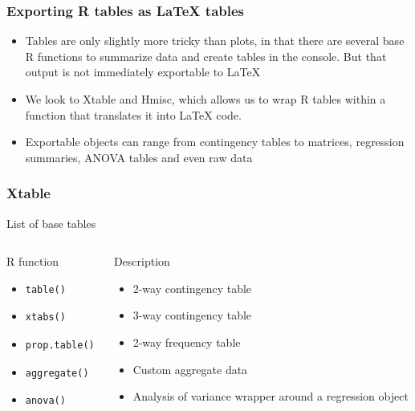 \documentclass[nogin]{beamer}\usepackage[]{graphicx}\usepackage[]{color}
\begin{document}
\begin{frame}[fragile]
\frametitle{Exporting R tables as LaTeX tables }
\begin{itemize}
\item Tables are only slightly more tricky than plots, in that there are several base R functions to summarize data and create tables in the console. But that output is not immediately exportable to LaTeX
\item We look to Xtable and Hmisc, which allows us to wrap R tables within a function that translates it into LaTeX code.
\item Exportable objects can range from contingency tables to matrices, regression summaries, ANOVA tables and even raw data
\end{itemize}
\end{frame}

\begin{frame}[fragile]
\frametitle{Xtable}
{\small List of base tables}
\begin{columns}[T]
\begin{column}{.5\textwidth}
\begin{block}{R function}
\begin{itemize}
\item \begin{verbatim}table()\end{verbatim}
\item \begin{verbatim}xtabs()\end{verbatim}
\item \begin{verbatim}prop.table()\end{verbatim}
\item \begin{verbatim}aggregate()\end{verbatim}
\item \begin{verbatim}anova()\end{verbatim}
\end{itemize}
\end{block}
\end{column}
\begin{column}{.5\textwidth}
\begin{block}{Description}
\begin{itemize}
\footnotesize
\item 2-way contingency table
\item 3-way contingency table
\item 2-way frequency table
\item Custom aggregate data
\item Analysis of variance wrapper around a regression object
\end{itemize}
\end{block}
\end{column}
\end{columns}
\end{frame}
\end{document}
